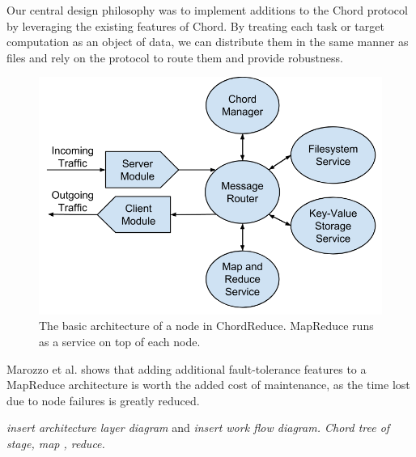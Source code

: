 \documentclass[10pt, conference, compsocconf]{IEEEtran}
\begin{document}
Our central design philosophy was to implement additions to the Chord protocol by leveraging the existing features of Chord.  By treating each task or target computation as an object of data, we can distribute them in the same manner as files and rely on the protocol to route them and provide robustness.



\begin{figure}
    \includegraphics[width=\linewidth]{crArch}
    \caption{The basic architecture of a node in ChordReduce.  MapReduce runs as a service on top of each node.}
    \label{crArch}
\end{figure}


Marozzo et al. \cite{marozzo2012p2p} shows that adding additional fault-tolerance features to a MapReduce architecture is worth the added cost of maintenance, as the time lost due to node failures is greatly reduced.

\textit{insert architecture layer diagram }  and \textit{insert work flow diagram.  Chord tree of stage, map , reduce.}
\end{document}
